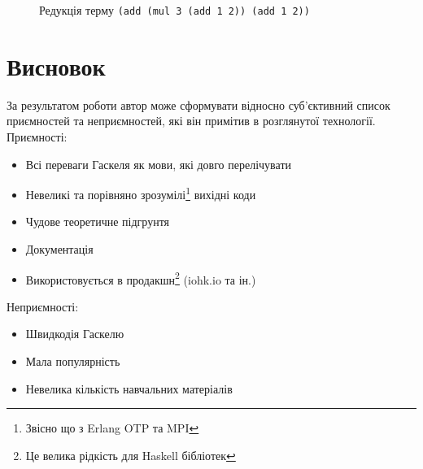 \documentclass[12pt]{article}
\begin{document}
\begin{figure}

\vspace{20mm}


\vspace{20mm}

\caption{Редукція терму 
\lstinline{(add (mul 3 (add 1 2)) (add 1 2))}
} 
\label{reduction1}
\end{figure}



\section{Висновок}

За результатом роботи автор може сформувати відносно суб'єктивний список приємностей та неприємностей, які він примітив в розглянутої технології.\\

Приємності:
\begin{itemize}
    \item Всі переваги Гаскеля як мови, які довго перелічувати
    \item Невеликі та порівняно зрозумілі\footnote{Звісно що з Erlang OTP та MPI} вихідні коди
    \item Чудове теоретичне підгрунтя
    \item Документація
    \item Використовується в продакшн\footnote{Це велика рідкість для Haskell бібліотек} (iohk.io та ін.)
\end{itemize}

Неприємності:
\begin{itemize}
    \item Швидкодія Гаскелю
    \item Мала популярність
    \item Невелика кількість навчальних матеріалів
\end{itemize}

\newpage

\printbibliography[title={Перелік посилань}]
\end{document}
